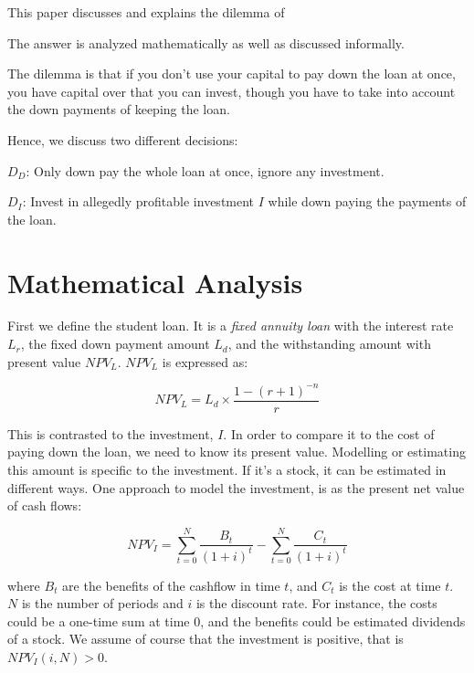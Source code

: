 \documentclass[a4paper]{article}
\title{\documenttitle}
\date{\today}
\author{Frans Englich \\
\href{mailto:fenglich@fastmail.fm}{fenglich@fastmail.fm}}
\begin{document}
\maketitle

This paper discusses and explains the dilemma of 

The answer is analyzed mathematically as well as discussed
informally.

The dilemma is that if you don't use your capital to pay down the loan at once,
you have capital over that you can invest, though you have to take into account
the down payments of keeping the loan.

Hence, we discuss two different decisions:

$D_D$: Only down pay the whole loan at once, ignore any investment.

$D_I$: Invest in allegedly profitable investment $I$ while down paying the
payments of the loan.

\section{Mathematical Analysis}

First we define the student loan. It is a \emph{fixed annuity loan} with the
interest rate $L_r$, the fixed down payment amount $L_d$, and the withstanding
amount with present value $NPV_L$. $NPV_L$ is expressed as:

\def\NPVL{L_d \times \frac{1 - (r + 1)^{-n}}{r}}
\begin{equation}
NPV_L=\NPVL
\end{equation}

This is contrasted to the investment, $I$. In order to compare it to the cost of
paying down the loan, we need to know its present value. Modelling or estimating
this amount is specific to the investment. If it's a stock, it can be estimated
in different ways. One approach to model the investment, is as the present net
value of cash flows:

\def\NPV_I{\sum_{t=0}^{N} \frac{B_t}{(1 + i)^t} - \sum_{t=0}^{N} \frac{C_t}{(1 + i)^t}}
\begin{equation}
NPV_I = \NPV_I
\end{equation}

where $B_t$ are the benefits of the cashflow in time $t$, and $C_t$ is the cost
at time $t$. $N$ is the number of periods and $i$ is the discount rate. For
instance, the costs could be a one-time sum at time $0$, and the benefits could
be estimated dividends of a stock. We assume of course that the investment is
positive, that is $NPV_I(i, N) > 0$.
\end{document}
